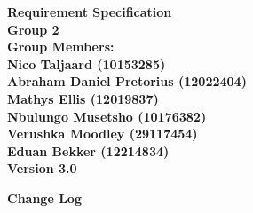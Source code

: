 \documentclass[12pt]{article}
\newcommand{\Title}{Requirement Specification} %
\begin{document}
	\vspace{4em}
	
	\begin{center}%
	
	  \LARGE \bf \Title \\[4em]
	  \LARGE {\bf Group 2}\\[1em]
	  \LARGE {\bf Group Members:}\\[2em]
	  \large
	     Nico Taljaard					(10153285) \\[1em]
	     Abraham Daniel Pretorius		(12022404) \\[1em]
	     Mathys Ellis					(12019837) \\[1em]
	     Nbulungo Musetsho				(10176382) \\[1em]
	     Verushka Moodley				(29117454) \\[1em]
	     Eduan Bekker					(12214834) \\[8em]
	     {\bf Version 3.0}
	    
	\end{center}%
	
	\newpage
		{\LARGE \bf Change Log}\\[2em]
		
\end{document}
